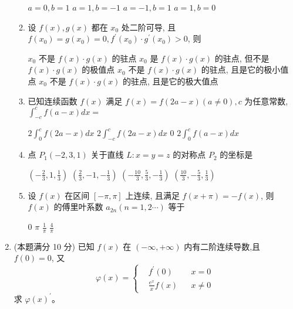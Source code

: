 \begin{enumerate}
\begin{enumerate}
	
\fourchoices
{$a=0, b=1$}
{$a=1, b=-1$}
{$a=-1, b=1$}
{$a=1, b=0$}

	
	
	\item
	设 $f(x), g(x)$ 都在 $x_{0}$ 处二阶可导, 且 $f\left(x_{0}\right)=g\left(x_{0}\right)=0, f^{\prime}\left(x_{0}\right) \cdot g^{\prime}\left(x_{0}\right)>0$, 则  
	
	
\fourchoices
{$x_{0}$ 不是 $f(x) \cdot g(x)$ 的驻点}
{$x_{0}$ 是 $f(x) \cdot g(x)$ 的驻点, 但不是 $f(x) \cdot g(x)$ 的极值点}
{$x_{0}$ 不是 $f(x) \cdot g(x)$ 的驻点, 且是它的极小值点}
{$x_{0}$ 不是 $f(x) \cdot g(x)$ 的驻点, 且是它的极大值点}

	
\item 
已知连续函数 $f(x)$ 满足 $f(x)=f(2 a-x)(a \neq 0), c$ 为任意常数, $\int_{-c}^{c} f(a-x) d x=$


\fourchoices
{$2 \int_{0}^{c} f(2 a-x) d x$}
{$2 \int_{-c}^{c} f(2 a-x) d x$}
{$ 0 $}
{$2 \int_{0}^{c} f(a-x) d x$}
	

\item 
点 $P_{1}(-2,3,1)$ 关于直线 $L: x=y=z$ 的对称点 $P_{2}$ 的坐标是  


\fourchoices
{$\left(-\frac{2}{3}, 1, \frac{1}{3}\right)$}
{$\left(\frac{2}{3},-1,-\frac{1}{3}\right)$}
{$\left(-\frac{10}{3}, \frac{5}{3},-\frac{1}{3}\right)$}
{$\left(\frac{10}{3},-\frac{5}{3}, \frac{1}{3}\right)$}



\item
设 $f(x)$ 在区间 $[-\pi, \pi]$ 上连续, 且满足 $f(x+\pi)=-f(x)$, 则 $f(x)$ 的傅里叶系数 $a_{2 n}(n=1,2 \cdots)$ 等于  


\fourchoices
{$ 0 $}
{$\pi$}
{$\frac{1}{\pi}$}
{$\frac{4}{\pi}$}


	
\end{enumerate}



\item 
(本题满分 10 分)
已知 $f(x)$ 在 $(-\infty,+\infty)$ 内有二阶连续导数,且 $f(0)=0$, 又 
\[ 
\varphi(x)=\left\{\begin{aligned}&f^{\prime}(0) && x=0 \\ 
	&\frac{e^{x}}{x} f(x) && x \neq 0\end{aligned}\right.
 \]
 求 $\varphi(x) ^{\prime} $。






\end{enumerate}
